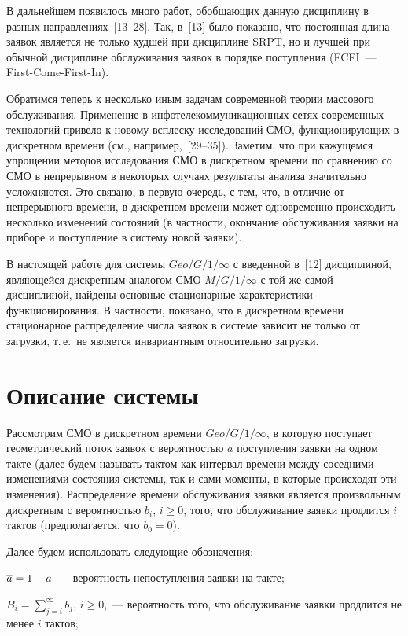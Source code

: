 \begin{multicols}{2}
В дальнейшем появилось много работ, обобщающих данную
дисциплину в разных направлениях~[13--28].
Так, в~[13] было показано, что постоянная длина заявок
является не только худшей при дисциплине SRPT, но и лучшей
при обычной дисциплине обслуживания заявок в порядке
поступления (FCFI~--- First-Come-First-In).

Обратимся теперь к несколько иным задачам современной
теории массового обслуживания.
Применение в инфотелекоммуникационных сетях современных
технологий привело к новому всплеску исследований СМО,
функционирующих в дискретном времени
(см., например,~[29--35]).
Заметим, что при кажущемся упрощении методов исследования
СМО в дискретном времени по сравнению со СМО в непрерывном
в некоторых случаях результаты анализа значительно
усложняются.
Это связано, в первую очередь, с тем, что, в отличие от
непрерывного времени, в дискретном времени может
одновременно происходить несколько изменений состояний
(в частности, окончание обслуживания заявки на приборе
и поступление в систему новой заявки).

В настоящей работе для системы $Geo/G/1/\infty$ с
введенной в~[12] дисциплиной, являющейся дискретным
аналогом СМО $M/G/1/\infty$ с той же самой дисциплиной,
найдены основные стационарные характеристики
функционирования.
В частности, показано, что в дискретном времени стационарное
распределение числа заявок в системе зависит не только от
загрузки, т.\,е.\ не является инвариантным относительно
загрузки.

\section{Описание системы}

Рассмотрим СМО в дискретном времени $Geo/G/1/\infty$, в
которую поступает геометрический поток заявок с вероятностью
$a$ поступления заявки на одном такте
(далее будем называть тактом как интервал времени между соседними
изменениями состояния системы, так и сами моменты, в которые
происходят эти изменения).
Распределение времени обслуживания заявки является
произвольным дискретным с вероятностью $b_i$, $i\ge 0$,
того, что обслуживание заявки продлится $i$ тактов
(предполагается, что $b_0=0$).

Далее будем использовать следующие обозначения:

$\overline a=1-a$~--- вероятность непоступления заявки на такте;

$B_i=\sum_{j=i}^\infty b_j$, $i\ge0$,~--- вероятность того,
что обслуживание заявки продлится не менее $i$ тактов;


\end{multicols}
